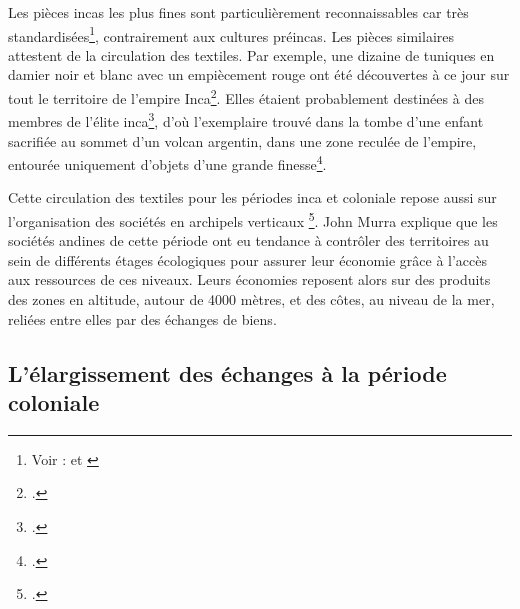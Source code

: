 Les pièces incas les plus fines sont particulièrement reconnaissables car très standardisées\footnote{Voir : \cite[p.~60]{nilesArtistEmpireInca1994} et \cite[p.~118]{ramosTejidosSociedadColonial2010}}, contrairement aux cultures préincas. Les pièces similaires attestent de la circulation des textiles. Par exemple, une dizaine de tuniques en damier noir et blanc avec un empiècement rouge ont été découvertes à ce jour sur tout le territoire de l'empire Inca\footcite[p.395]{abalderussoArteTextilIncaico2010}. Elles étaient probablement destinées à des membres de l'élite inca\footcite[p.54]{nilesArtistEmpireInca1994}, d'où l'exemplaire trouvé dans la tombe d'une enfant sacrifiée au sommet d'un volcan argentin, dans une zone reculée de l'empire, entourée uniquement d'objets d'une grande finesse\footcite[p.260]{abalderussoArteTextilIncaico2010}.

Cette circulation des textiles pour les périodes inca et coloniale repose aussi sur l'organisation des sociétés en \og archipels verticaux \fg\footcite[p.~60]{murraControlVerticalMaximo1975}. John Murra explique que les sociétés andines de cette période ont eu tendance à contrôler des territoires au sein de différents étages écologiques pour assurer leur économie grâce à l'accès aux ressources de ces niveaux. Leurs économies reposent alors sur des produits des zones en altitude, autour de 4000 mètres, et des côtes, au niveau de la mer, reliées entre elles par des échanges de biens.

\subsection{L'élargissement des échanges à la période coloniale}

